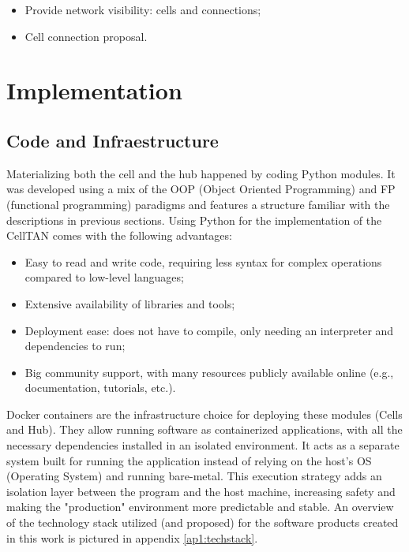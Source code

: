 \begin{itemize}
    \item Provide network visibility: cells and connections;
    \item Cell connection proposal.
\end{itemize}


\section{Implementation}

\subsection{Code and Infraestructure}

Materializing both the cell and the hub happened by coding Python modules. It was developed using a mix of the OOP (Object Oriented Programming) and FP (functional programming) paradigms and features a structure familiar with the descriptions in previous sections. Using Python for the implementation of the CellTAN comes with the following advantages:

\begin{itemize}
    \item Easy to read and write code, requiring less syntax for complex operations compared to low-level languages;
    \item Extensive availability of libraries and tools;
    \item Deployment ease: does not have to compile, only needing an interpreter and dependencies to run;
    \item Big community support, with many resources publicly available online (e.g., documentation, tutorials, etc.). 
\end{itemize}


Docker containers \cite{docker} are the infrastructure choice for deploying these modules (Cells and Hub). They allow running software as containerized applications, with all the necessary dependencies installed in an isolated environment. It acts as a separate system built for running the application instead of relying on the host's OS (Operating System) and running bare-metal. This execution strategy adds an isolation layer between the program and the host machine, increasing safety and making the "production" environment more predictable and stable. An overview of the technology stack utilized (and proposed) for the software products created in this work is pictured in appendix \ref{ap1:techstack}.


